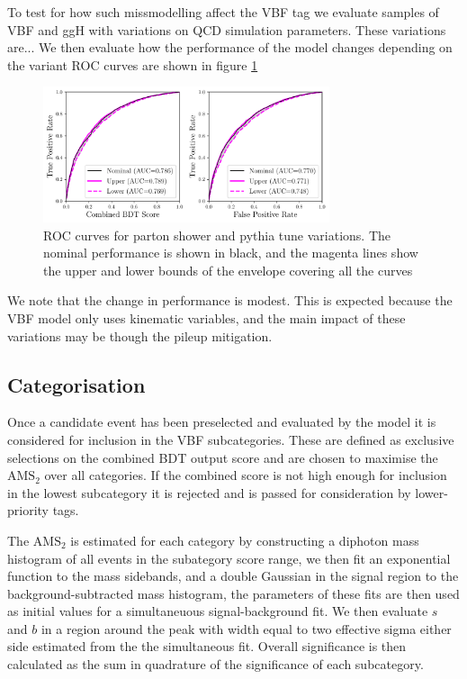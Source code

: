 To test for how such missmodelling affect the VBF tag we evaluate samples of VBF and ggH with variations on QCD simulation parameters.
These variations are...
We then evaluate how the performance of the model changes depending on the variant
ROC curves are shown in figure \ref{fig:event_categorisation:ps_variant_validation}
\begin{figure}[h!]
    \begin{center}
        \includegraphics[width=0.75\textwidth]{figures/event_selection/psvar_ROCs_PS.pdf}
    \end{center}
    \caption{ROC curves for parton shower and pythia tune variations. The nominal performance is shown in black, 
             and the magenta lines show the upper and lower bounds of the envelope covering all the curves}
    \label{fig:event_categorisation:ps_variant_validation}
\end{figure}

We note that the change in performance is modest. This is expected because the VBF model only uses kinematic variables, and the main impact of these variations may be though the pileup mitigation. 







\subsection{Categorisation}
Once a candidate event has been preselected and evaluated by the model it is considered for inclusion in the VBF subcategories. 
These are defined as exclusive selections on the combined BDT output score and are chosen to maximise the $\mathrm{AMS}_2$ over all categories. 
If the combined score is not high enough for inclusion in the lowest subcategory it is rejected and is passed for consideration by lower-priority tags. 

The $\mathrm{AMS}_2$ is estimated for each category by constructing a diphoton mass histogram of all events in the subategory score range, we then fit an exponential function to the mass sidebands, and a double Gaussian in the signal region to the background-subtracted mass histogram, the parameters of these fits are then used as initial values for a simultaneuous signal-background fit. We then evaluate $s$ and $b$ in a region around the peak with width equal to two effective sigma either side estimated from the the simultaneous fit. Overall significance is then calculated as the sum in quadrature of the significance of each subcategory. 

